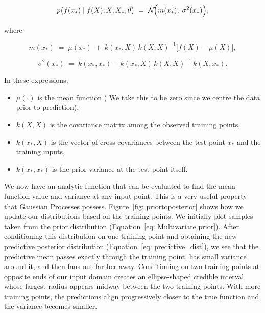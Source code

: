 \documentclass{article}
\begin{document}
\begin{equation}
p\bigl(f(x_*) \mid f(X), X, X_*,\theta \bigr)
\;=\;
\mathcal{N}\!\Bigl(
m(x_*),\;\sigma^2(x_*)
\Bigr),
\label{eq: predictive_dist}
\end{equation}

\noindent
where

\begin{equation}
m(x_*) \;=\; \mu(x_*) \;+\;k(x_*, X)\,k(X, X)^{-1}\bigl[f(X) - \mu(X)\bigr],
\label{eq: predictive_mean}
\end{equation}

\begin{equation}
\sigma^2(x_*) \;=\;k(x_*, x_*) - k(x_*, X)\,k(X, X)^{-1}\,k(X, x_*).
\label{eq: predictive_variance}
\end{equation}

In these expressions:
\begin{itemize}
    \item \( \mu(\cdot) \) is the mean function ( We take this to be zero since we centre the data prior to prediction),
    \item \( k(X, X) \) is the covariance matrix among the observed training points,
    \item \( k(x_*, X) \) is the vector of cross-covariances between the test point \(x_*\) and the training inputs,
    \item \( k(x_*, x_*) \) is the prior variance at the test point itself.
\end{itemize}

\noindent
We now have an analytic function that can be evaluated to find the mean function value and variance at any input point.
This is a very useful property that Gaussian Processes possess. Figure~\ref{fig: priortoposterior} shows how we update our
distributions based on the training points. We initially plot samples taken from the prior distribution (Equation~\ref{eq: Multivariate prior}). 
After conditioning this distribution on one training point and obtaining the new predictive posterior distribution (Equation~\ref{eq: predictive_dist}), 
we see that the predictive mean passes exactly through the training point, has small variance around it, and then fans out farther away. 
Conditioning on two training points at opposite ends of our input domain creates an ellipse-shaped credible interval whose largest radius 
appears midway between the two training points. With more training points, the predictions align progressively closer to the true function 
and the variance becomes smaller.
\end{document}
